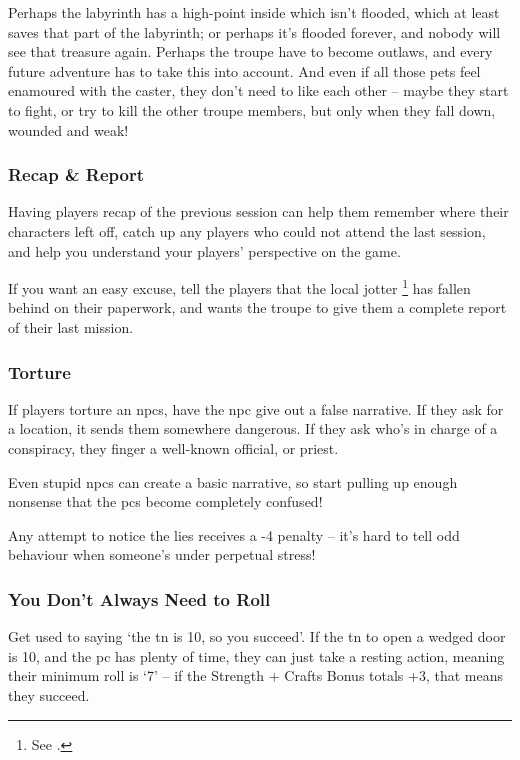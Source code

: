 \begin{multicols}{2}
Perhaps the labyrinth has a high-point inside which isn't flooded, which at least saves that part of the labyrinth; or perhaps it's flooded forever, and nobody will see that treasure again.
Perhaps the troupe have to become outlaws, and every future adventure has to take this into account.
And even if all those pets feel enamoured with the caster, they don't need to like each other -- maybe they start to fight, or try to kill the other troupe members, but only when they fall down, wounded and weak!

\subsubsection{Recap \& Report}

Having players recap of the previous session can help them remember where their characters left off, catch up any players who could not attend the last session, and help you understand your players' perspective on the game.

If you want an easy excuse, tell the players that the local \gls{jotter}%
\footnote{See .}
has fallen behind on their paperwork, and wants the troupe to give them a complete report of their last mission.

\subsubsection{Torture}

If players torture an \glspl{npc}, have the \gls{npc} give out a false narrative.
If they ask for a location, it sends them somewhere dangerous.
If they ask who's in charge of a conspiracy, they finger a well-known official, or priest.

Even stupid \glspl{npc} can create a basic narrative, so start pulling up enough nonsense that the \glspl{pc} become completely confused!

Any attempt to notice the lies receives a -4 penalty -- it's hard to tell odd behaviour when someone's under perpetual stress!

\subsubsection{You Don't Always Need to Roll}

Get used to saying `the \gls{tn} is 10, so you succeed'.
If the \gls{tn} to open a wedged door is 10, and the \gls{pc} has plenty of time, they can just take a resting action, meaning their minimum roll is `7' -- if the Strength + Crafts Bonus totals +3, that means they succeed.


\end{multicols}

